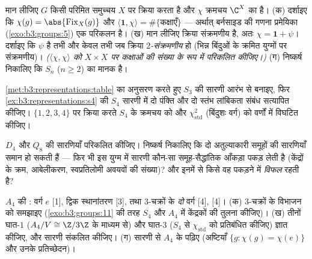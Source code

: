 \begin{exercise}[$\star$]\label{exo:b3:representations:2}
मान लीजिए $G$ किसी परिमित समुच्चय $X$ पर क्रिया करता है और
$\chi$ क्रमचय  $\C^X$ का  है।
(क) दर्शाइए कि $\chi(g) = \abs{\operatorname{Fix}_X(g)}$ और $\langle \mathbf 1, \chi\rangle = \#\{\text{कक्षाएँ}\}$ --- अर्थात् बर्नसाइड की गणना
प्रमेयिका (\cref{exo:b3:groups:5}) एक  परिकलन है।
(ख) मान लीजिए क्रिया संक्रमणीय है, अतः $\chi = \mathbf 1 +
\psi$। दर्शाइए कि $\psi$
 है तभी और केवल तभी जब क्रिया \emph{$2$-संक्रमणीय} हो
(भिन्न बिंदुओं के क्रमित युग्मों पर संक्रमणीय)। \emph{($\langle\chi,\chi\rangle$ को
$X \times X$ पर कक्षाओं की संख्या के रूप में परिकलित कीजिए।)}
(ग) निष्कर्ष निकालिए कि $S_n$ ($n \geq
2$) का मानक   है।
\end{exercise}

\begin{exercise}[$\star$]\label{exo:b3:representations:3}
\cref{met:b3:representations:table} का अनुसरण करते हुए $S_3$ की सारणी आरंभ से बनाइए, फिर \cref{ex:b3:representations:s4}
की $S_4$ सारणी में दो पंक्ति और दो स्तंभ लांबिकता संबंध सत्यापित
कीजिए। $\{1,2,3,4\}$ पर क्रिया करते $S_4$ के क्रमचय  को और 
$\chi_{\mathrm{std}}^2$ (बिंदुशः वर्ग) को  वर्णों में विघटित कीजिए।
\end{exercise}

\begin{exercise}[$\star\star$]\label{exo:b3:representations:4}
$D_4$ और $Q_8$ की  सारणियाँ परिकलित कीजिए। निष्कर्ष निकालिए
कि दो अतुल्याकारी समूहों की  सारणियाँ समान हो सकती हैं ---
फिर भी इस युग्म में सारणी कौन-सा समूह-सैद्धांतिक आँकड़ा पकड़
लेती है (केंद्रों के क्रम, आबेलीकरण, स्वप्रतिलोमी अवयवों की
संख्या)? और इनमें से किसे वह पकड़ने में \emph{विफल} रहती है?
\end{exercise}

\begin{exercise}[$\star\star$]\label{exo:b3:representations:5}
$A_4$ की : वर्ग $e$ [1], द्विक स्थानांतरण [3], तथा
$3$-चक्रों के \emph{दो} वर्ग [4], [4]।
(क) $3$-चक्रों के विभाजन को समझाइए (\cref{exo:b3:groups:11} की तरह $S_4$ और
$A_4$ में केंद्रकों की तुलना कीजिए)।
(ख) तीनों घात-$1$  ($A_4/V \cong
\Z/3\Z$ के माध्यम से) और घात-$3$ 
($S_4$ से $\chi_{\mathrm{std}}$ को प्रतिबंधित कीजिए) ज्ञात कीजिए, और सारणी
संकलित कीजिए।
(ग) सारणी से $A_4$ के  पढ़िए (अष्टियाँ $\{g : \chi(g) = \chi(e)\}$
और उनके प्रतिच्छेदन)।
\end{exercise}

